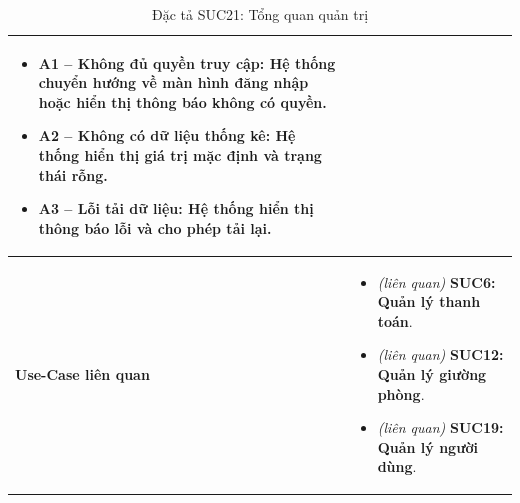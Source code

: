 \begin{table}[H]
\begin{tabularx}{\textwidth}{|>{\centering\arraybackslash\bfseries}m{3.5cm}|X|}
\begin{itemize}[leftmargin=*, nosep, label=-]
        \vspace{0.1cm}
        \item \textbf{A1 -- Không đủ quyền truy cập:} Hệ thống chuyển hướng về màn hình đăng nhập hoặc hiển thị thông báo không có quyền.
        \item \textbf{A2 -- Không có dữ liệu thống kê:} Hệ thống hiển thị giá trị mặc định và trạng thái rỗng.
        \item \textbf{A3 -- Lỗi tải dữ liệu:} Hệ thống hiển thị thông báo lỗi và cho phép tải lại.
    \end{itemize} \\
    \hline
    Use-Case liên quan &
    \begin{itemize}[leftmargin=*, nosep, label=-]
        \vspace{0.1cm}
        \item \textit{(liên quan)} \textbf{SUC6: Quản lý thanh toán}.
        \item \textit{(liên quan)} \textbf{SUC12: Quản lý giường phòng}.
        \item \textit{(liên quan)} \textbf{SUC19: Quản lý người dùng}.
\end{itemize} \\
    \hline
\end{tabularx}
\caption{Đặc tả SUC21: Tổng quan quản trị}
\end{table}

